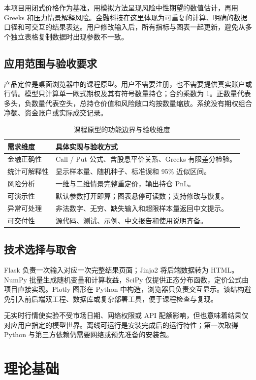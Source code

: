 \documentclass[UTF8,a4paper,12pt]{ctexart}
\begin{document}
本项目用闭式价格作为基准，用模拟方法呈现风险中性期望的数值估计，再用 Greeks 和压力情景解释风险。金融科技在这里体现为可重复的计算、明确的数据口径和可交互的结果表达。用户修改输入后，所有指标与图表一起更新，避免从多个独立表格复制数据时出现参数不一致。

\subsection{应用范围与验收要求}
产品定位是桌面浏览器中的课程原型。用户不需要注册，也不需要提供真实账户或行情。模型只计算单一欧式期权及其有符号数量持仓；合约乘数为 1。正数量代表多头，负数量代表空头，总持仓价值和风险敞口均按数量缩放。系统没有期权组合净额、资金账户或实际成交记录。

\begin{table}[H]\centering\small
\begin{tabularx}{\linewidth}{lX}
\toprule 需求维度 & 具体实现与验收方式\\\midrule
金融正确性 & Call / Put 公式、含股息平价关系、Greeks 有限差分检验。\\
统计可解释性 & 显示样本量、随机种子、标准误和 95\% 近似区间。\\
风险分析 & 一维与二维情景完整重定价，输出持仓 PnL。\\
可演示性 & 默认参数打开即算；图表悬停可读数；支持修改与恢复。\\
异常可处理 & 非法数字、无穷、缺失输入和超限样本量返回中文提示。\\
可交付性 & 源代码、测试、示例、中文报告和使用说明齐备。\\\bottomrule
\end{tabularx}\caption{课程原型的功能边界与验收维度}
\end{table}

\subsection{技术选择与取舍}
Flask 负责一次输入对应一次完整结果页面；Jinja2 将后端数据转为 HTML。NumPy 批量生成随机变量和计算收益，SciPy 仅提供正态分布函数，定价公式由项目直接实现。Plotly 图形在 Python 中构造，浏览器只负责交互显示。该结构避免引入前后端双工程、数据库或复杂部署工具，便于课程检查与复现。

无实时行情使实验不受市场日期、网络权限或 API 配额影响，但也意味着结果仅对应用户指定的模型世界。离线可运行是安装完成后的运行特性；第一次取得 Python 与第三方依赖仍需要网络或预先准备的安装包。
\newpage

\section{理论基础}
\end{document}
